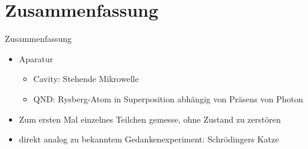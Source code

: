 \documentclass{beamer}
\begin{document}
\section{Zusammenfassung}
\begin{frame}{Zusammenfassung}
	\begin{itemize}
		\item Aparatur
		      \begin{itemize}
			      \item Cavity: Stehende Mikrowelle
			      \item QND: Rysberg-Atom in Superposition abhängig von Präsens von Photon
		      \end{itemize}
        \item Zum ersten Mal einzelnes Teilchen gemesse, ohne Zustand zu zerstören
        \item direkt analog zu bekanntem Gedankenexperiment: Schrödingers Katze
	\end{itemize}
\end{frame}
\begin{frame}
	\printbibliography
\end{frame}
\end{document}
